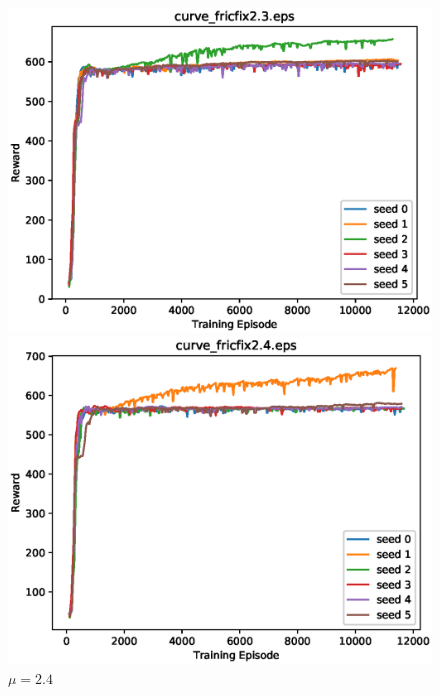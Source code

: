 \begin{figure}[p]
 \begin{minipage}{0.49\hsize}
  \begin{center}
 \includegraphics[width=.99\linewidth]{./fig/curve_fricfix2.3.eps}
  \caption{$\mu=2.3$
  }
  \end{center}
 \end{minipage}
 \begin{minipage}{0.49\hsize}
   \begin{center}
 \includegraphics[width=.99\linewidth]{./fig/curve_fricfix2.4.eps}
  \caption{$\mu=2.4$
     }
  \end{center}
 \end{minipage}
\end{figure}


